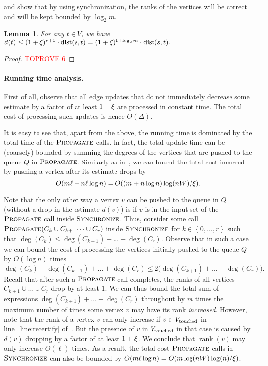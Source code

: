 \documentclass[11pt,letterpaper]{article}
\theoremstyle{plain}
\newtheorem{lemma}[theorem]{Lemma}
\renewcommand{\O}{O}
\newcommand{\dist}{\mathrm{dist}}
\newcommand{\set}[1]{\left\lbrace #1 \right\rbrace}
\DeclareMathOperator*{\rank}{rank}
\DeclareMathOperator*{\PD}{\textsc{Propagate}}
\begin{document}
 and  show that by using synchronization, the ranks of the vertices will be correct and will be kept bounded by $\log_2 m$.
\begin{lemma}\label{l:rank}
For any $t\in V$, we have
$ d(t)\leq (1+\epsp)^{r+1}\cdot \dist(s,t)=(1+\epsp)^{1+\log_2{m}}\cdot \dist(s,t).$
\end{lemma}
\begin{proof}\textcolor{red}{TOPROVE 6}\end{proof}

\paragraph{Running time analysis.} 
First of all, observe that all edge updates that do not immediately
decrease some estimate by a factor of at least $1+\xi$ are processed in constant time.
The total cost of processing such updates is hence $\O(\Delta)$.

It is easy to see that, apart from the above, the running time is dominated by the total time of the $\PD$ calls. 
In fact, the total update time can be (coarsely) bounded by summing the degrees of the vertices that are pushed to the queue $Q$ in $\PD$.
Similarly as in~, we can bound the total cost incurred by pushing a vertex after its estimate drops by
\[ \O(m\ell+n\ell\log{n})=\O((m+n\log{n})\log(nW)/\epsp).\]

Note that the only other way a vertex $v$ can be pushed to the queue in $Q$ (without a drop in the estimate $d(v)$) is if $v$ is in the input set of the $\PD$ call inside $\textsc{Synchronize}$.
Thus, consider some call $\PD(C_k \cup C_{k + 1} \dots \cup C_{r})$ inside $\textsc{Synchronize}$ for $k \in \set{0, \dots, r}$ such that
  $\deg(C_k) \le \deg(C_{k + 1}) + \dots + \deg(C_r)$.
Observe that in such a case we can bound the cost of processing the vertices initially pushed to the queue $Q$ by $\O(\log{n})$ times
  \[ \deg(C_k) + \deg(C_{k + 1}) + \dots + \deg(C_r) \le 2 \big( \deg(C_{k + 1}) + \dots + \deg(C_r) \big).\]
Recall that after such a $\PD$ call completes, the ranks of all vertices
$C_{k+1}\cup\ldots\cup C_r$ drop by at least $1$. We can thus bound the
total sum of expressions $\deg(C_{k+1})+\ldots+\deg(C_r)$ throughout by $m$ times the maximum number of times some vertex $v$ may have its rank \emph{increased}.
However, note that the rank of a vertex $v$ can only increase if $v\in V_{\mathrm{touched}}$ in line~\ref{line:recertify} of~.
But the presence of $v$ in $V_{\mathrm{touched}}$ in that case is caused by $d(v)$ dropping by a factor of at least $1+\xi$.
We conclude that $\rank(v)$ may only increase $\O(\ell)$ times.
As a result, the total cost $\PD$ calls in $\textsc{Synchronize}$ can
also be bounded by $\O(m\ell\log{n})=\O(m\log(nW)\log(n)/\epsp)$.
\end{document}

